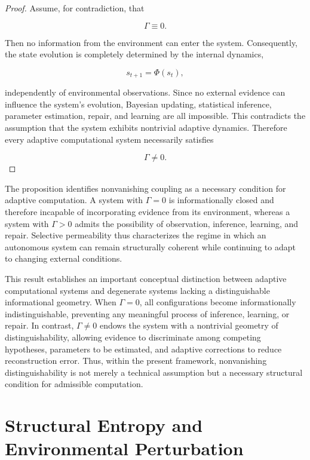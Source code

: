 \documentclass[11pt,oneside]{book}
\numberwithin{equation}{chapter}
\theoremstyle{definition}
\theoremstyle{plain}
\begin{document}
\begin{proof}

Assume, for contradiction, that

\[
\Gamma \equiv 0.
\]

Then no information from the environment can enter the system. Consequently, the state evolution is completely determined by the internal dynamics,

\[
s_{t+1}=\Phi(s_t),
\]

independently of environmental observations. Since no external evidence can influence the system's evolution, Bayesian updating, statistical inference, parameter estimation, repair, and learning are all impossible. This contradicts the assumption that the system exhibits nontrivial adaptive dynamics. Therefore every adaptive computational system necessarily satisfies

\[
\Gamma \neq 0.
\]

\end{proof}

The proposition identifies nonvanishing coupling as a necessary condition for adaptive computation. A system with $\Gamma = 0$ is informationally closed and therefore incapable of incorporating evidence from its environment, whereas a system with $\Gamma > 0$ admits the possibility of observation, inference, learning, and repair. Selective permeability thus characterizes the regime in which an autonomous system can remain structurally coherent while continuing to adapt to changing external conditions.

This result establishes an important conceptual distinction between
adaptive computational systems and degenerate systems lacking a
distinguishable informational geometry. When \(\Gamma = 0\), all
configurations become informationally indistinguishable, preventing any
meaningful process of inference, learning, or repair. In contrast,
\(\Gamma \neq 0\) endows the system with a nontrivial geometry of
distinguishability, allowing evidence to discriminate among competing
hypotheses, parameters to be estimated, and adaptive corrections to
reduce reconstruction error. Thus, within the present framework,
nonvanishing distinguishability is not merely a technical assumption but
a necessary structural condition for admissible computation.

\chapter{Structural Entropy and Environmental Perturbation}
\end{document}
